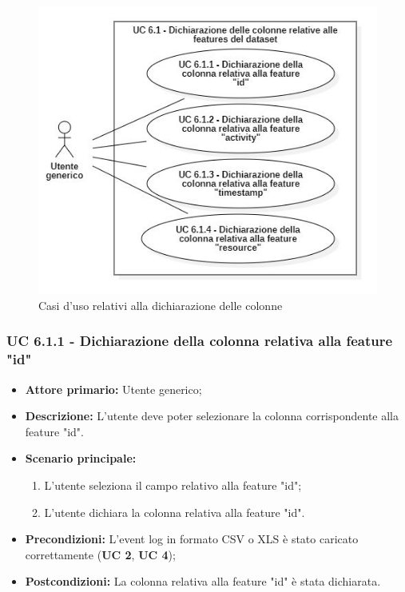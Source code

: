 \begin{figure}[H]
    \centering
    \includegraphics[scale=0.6]{immagini/usecase/cd5.JPG}
    \caption{Casi d'uso relativi alla dichiarazione delle colonne}
\end{figure}

\subsubsection{UC 6.1.1 - Dichiarazione della colonna relativa alla feature "id"}
\begin{itemize}
	\item \textbf{Attore primario:} Utente generico;
	\item \textbf{Descrizione:} L'utente deve poter selezionare la colonna corrispondente alla feature "id".
	\item \textbf{Scenario principale:} 
		\begin{enumerate}
			\item L'utente seleziona il campo relativo alla feature "id";
			\item L'utente dichiara la colonna relativa alla feature "id".
		\end{enumerate}
	\item \textbf{Precondizioni:} L'event log in formato CSV o XLS è stato caricato correttamente (\textbf{UC 2}, \textbf{UC 4});
	\item \textbf{Postcondizioni:} La colonna relativa alla feature "id" è stata dichiarata.
\end{itemize}


